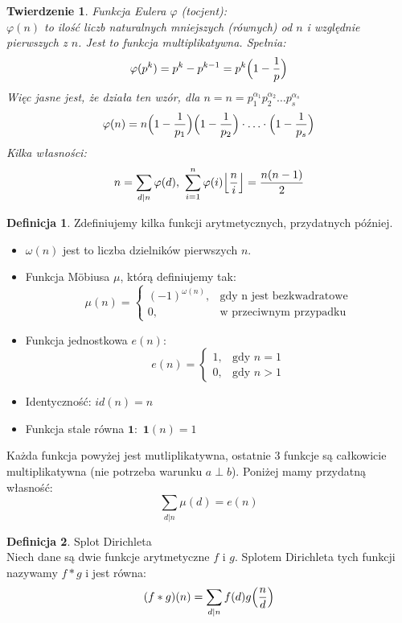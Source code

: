 \documentclass[10pt,a4paper]{article}
\theoremstyle{plain}
\newtheorem{thm}{Twierdzenie}[section]
\theoremstyle{definition}
\newtheorem{defi}{Definicja}[section]
\theoremstyle{remark}
\newcommand{\q}{\textbf{1}}
\begin{document}
	\begin{thm} \color{black} Funkcja Eulera $\varphi$ (tocjent):
		\\ $\varphi(n)$ to ilość liczb naturalnych mniejszych (równych) od $n$ i względnie pierwszych z $n$. Jest to funkcja multiplikatywna. Spełnia:
		$$\varphi(p^k)=p^k-p^{k-1}=p^k\Bigl(1-\frac{1}{p}\Bigr)$$
		Więc jasne jest, że działa ten wzór, dla $n=n=p_1^{\alpha_1}p_2^{\alpha_2}\ldots p_s^{\alpha_s}$
		$$\varphi(n)=n\Bigl(1-\frac{1}{p_1}\Bigr)\Bigl(1-\frac{1}{p_2}\Bigr)\cdot \ldots \cdot \Bigl(1-\frac{1}{p_s}\Bigr)$$
		Kilka własności:
		$$n=\sum_{d|n}\varphi(d) \textrm{, } \sum_{i=1}^{n}\varphi(i)\Bigl\lfloor \frac{n}{i} \Bigr\rfloor = \frac{n(n-1)}{2}$$
	\end{thm}
	\begin{defi} \color{black} Zdefiniujemy kilka funkcji arytmetycznych, przydatnych później.
		\begin{itemize}
			\item $\omega(n)$ jest to liczba dzielników pierwszych $n$.
			\item Funkcja Möbiusa $\mu$, którą definiujemy tak:
			$$
			\mu(n)=
			\left\{ \begin{array}{ll}
			(-1)^{\omega(n)}, & \textrm{gdy n jest bezkwadratowe}\\
			0, & \textrm{w przeciwnym przypadku}
			\end{array} \right.	
			$$
			\item Funkcja jednostkowa $e(n)$:
			$$
			e(n)=
			\left\{ \begin{array}{ll}
			1, & \textrm{gdy } n=1\\
			0, & \textrm{gdy } n>1
			\end{array} \right.	
			$$
			\item Identyczność: $id(n)=n$
			\item Funkcja stale równa $\q:$ $\q (n)=1$
		\end{itemize}
		Każda funkcja powyżej jest mutliplikatywna, ostatnie $3$ funkcje są całkowicie multiplikatywna (nie potrzeba warunku $a\perp b$). Poniżej mamy przydatną własność:
		$$\sum_{d|n} \mu(d)=e(n)$$
	\end{defi}
	\begin{defi}{Splot Dirichleta}
		\\
		Niech dane są dwie funkcje arytmetyczne $f$ i $g$. Splotem Dirichleta tych funkcji nazywamy $f*g$ i jest równa:
		$$(f *g)(n)=\sum_{d|n}f(d)g\Bigl(\frac{n}{d}\Bigr)$$
	\end{defi}
\end{document}
